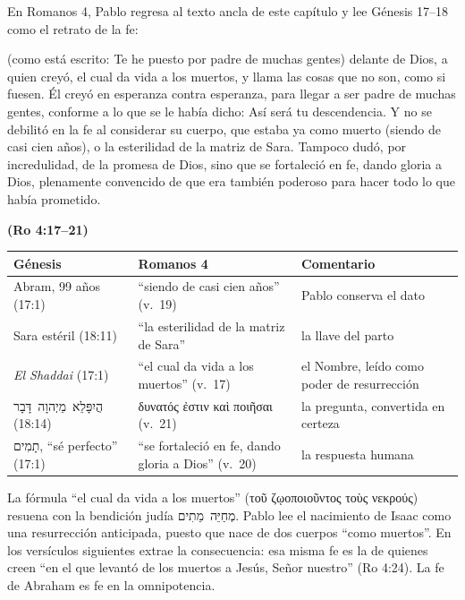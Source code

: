 \documentclass[11pt,letterpaper]{article}
\newcommand{\heb}[1]{\mbox{\foreignlanguage{hebrew}{#1}}}
\newcommand{\grc}[1]{\foreignlanguage{ancientgreek}{#1}}
\newcommand{\fuente}[1]{\par\hfill{\upshape\bfseries\small\textcolor{azul}{#1}}}
\begin{document}
En Romanos 4, Pablo regresa al texto ancla de este capítulo y lee Génesis 17--18 como el retrato de la fe:

\begin{cita}(como está escrito: Te he puesto por padre de muchas gentes) delante de Dios, a quien creyó, el cual da vida a los muertos, y llama las cosas que no son, como si fuesen. Él creyó en esperanza contra esperanza, para llegar a ser padre de muchas gentes, conforme a lo que se le había dicho: Así será tu descendencia. Y no se debilitó en la fe al considerar su cuerpo, que estaba ya como muerto (siendo de casi cien años), o la esterilidad de la matriz de Sara. Tampoco dudó, por incredulidad, de la promesa de Dios, sino que se fortaleció en fe, dando gloria a Dios, plenamente convencido de que era también poderoso para hacer todo lo que había prometido.\fuente{(Ro 4:17--21)}\end{cita}

\begin{center}\small\renewcommand{\arraystretch}{1.25}
\begin{tabular}{@{}L{4.4cm}L{5.0cm}L{5.0cm}@{}}
\toprule
\textbf{Génesis} & \textbf{Romanos 4} & \textbf{Comentario} \\ \midrule
Abram, 99 años (17:1) & ``siendo de casi cien años'' (v.~19) & Pablo conserva el dato \\
Sara estéril (18:11) & ``la esterilidad de la matriz de Sara'' & la llave del parto \\
\emph{El Shaddai} (17:1) & ``el cual da vida a los muertos'' (v.~17) & el Nombre, leído como poder de resurrección \\
\heb{הֲיִפָּלֵא מֵיְהוָה דָּבָר} (18:14) & \grc{δυνατός ἐστιν καὶ ποιῆσαι} (v.~21) & la pregunta, convertida en certeza \\
\heb{תָמִים}, ``sé perfecto'' (17:1) & ``se fortaleció en fe, dando gloria a Dios'' (v.~20) & la respuesta humana \\
\bottomrule
\end{tabular}\end{center}

La fórmula ``el cual da vida a los muertos'' (\grc{τοῦ ζῳοποιοῦντος τοὺς νεκρούς}) resuena con la bendición judía \heb{מְחַיֵּה מֵתִים}. Pablo lee el nacimiento de Isaac como una resurrección anticipada, puesto que nace de dos cuerpos ``como muertos''. En los versículos siguientes extrae la consecuencia: esa misma fe es la de quienes creen ``en el que levantó de los muertos a Jesús, Señor nuestro'' (Ro 4:24). La fe de Abraham es fe en la omnipotencia.
\end{document}
